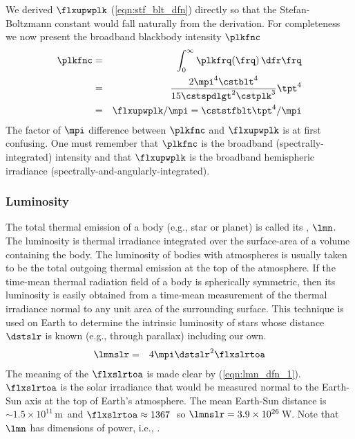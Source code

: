 \documentclass[12pt]{article}
\begin{document}
We derived $\flxupwplk$ (\ref{eqn:stf_blt_dfn}) directly so that
the Stefan-Boltzmann constant would fall naturally from the
derivation. 
For completeness we now present the broadband blackbody intensity
$\plkfnc$
\begin{eqnarray}
\plkfnc & = & \int_{0}^{\infty} \plkfrq(\frq) \,\dfr\frq \nonumber \\
& = & \frac{2 \mpi^{4} \cstblt^{4}}{15 \cstspdlgt^{2} \cstplk^{3}} \tpt^{4} \nonumber \\
& = & \flxupwplk / \mpi = \cststfblt \tpt^{4} / \mpi 
\label{eqn:plk_fnc_dfn}
\end{eqnarray}
The factor of $\mpi$ difference between $\plkfnc$ and $\flxupwplk$ 
is at first confusing.
One must remember that $\plkfnc$ is the broadband
(spectrally-integrated) intensity and that $\flxupwplk$ is the 
broadband hemispheric irradiance
(spectrally-and-angularly-integrated).  

\subsubsection[Luminosity]{Luminosity}\label{sxn:lmn}
The total thermal emission of a body (e.g., star or planet) is called  
its , $\lmn$.
The luminosity is thermal irradiance integrated over the surface-area
of a volume containing the body.
The luminosity of bodies with atmospheres is usually taken to be
the total outgoing thermal emission at the top of the atmosphere.
If the time-mean thermal radiation field of a body is spherically
symmetric, then its luminosity is easily obtained from a time-mean
measurement of the thermal irradiance normal to any unit area of the
surrounding surface.
This technique is used on Earth to determine the intrinsic luminosity
of stars whose distance $\dstslr$ is known (e.g., through parallax)
including our own.
\begin{eqnarray}
\lmnslr & = & 4\mpi\dstslr^{2} \flxslrtoa
\label{eqn:lmn_dfn_1}
\end{eqnarray}
The meaning of the  $\flxslrtoa$ is made clear
by (\ref{eqn:lmn_dfn_1}).
$\flxslrtoa$ is the solar irradiance that would be measured normal to
the Earth-Sun axis at the top of Earth's atmosphere.
The mean Earth-Sun distance is $\sim 1.5 \times 10^{11}$\,m\ and 
$\flxslrtoa \approx 1367$\,\wxmS\ so 
$\lmnslr = 3.9 \times 10^{26}$\,W.
Note that $\lmn$ has dimensions of power, i.e., \jxs.
\end{document}
